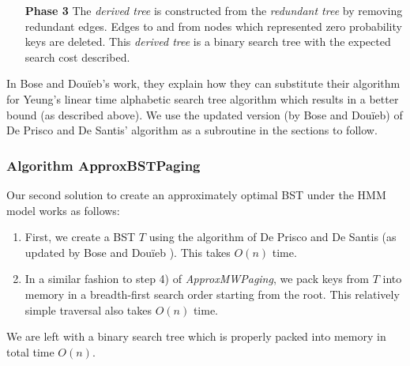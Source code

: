 \documentclass[]{beamer}
\theoremstyle{plain}
\begin{document}
\begin{frame}
\begin{itemize}
\item[\textbf{Phase 3}] The \textit{derived tree} is constructed from the \textit{redundant tree} by removing redundant edges. Edges to and from nodes which represented zero probability keys are deleted. This \textit{derived tree} is a binary search tree with the expected search cost described.
\end{itemize}


In Bose and Dou\"{i}eb's work, they explain how they can substitute their algorithm for Yeung's linear time alphabetic search tree algorithm which results in a better bound (as described above). We use the updated version (by Bose and Dou\"{i}eb) of De Prisco and De Santis' algorithm as a subroutine in the sections to follow.
\end{frame}


\begin{frame} \frametitle{Algorithm ApproxBSTPaging}\label{Algorithm ApproxBSTPaging}

Our second solution to create an approximately optimal BST under the HMM model works as follows: \\

\begin{enumerate}
\item First, we create a BST $T$ using the algorithm of De Prisco and De Santis \cite{de1993binary} (as updated by Bose and Dou\"{i}eb \cite{bose2009efficient}). This takes $O(n)$ time. \\

\item In a similar fashion to step 4) of \textit{ApproxMWPaging}, we pack keys from $T$ into memory in a breadth-first search order starting from the root. This relatively simple traversal also takes $O(n)$ time.
\end{enumerate}

We are left with a binary search tree which is properly packed into memory in total time $O(n)$.
\end{frame}
\end{document}
